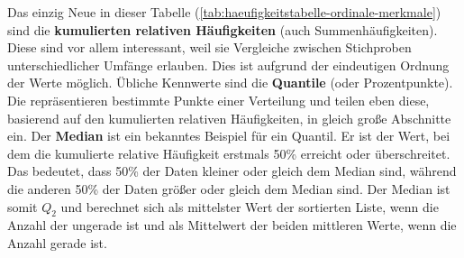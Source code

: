 \newline
Das einzig Neue in dieser Tabelle (\ref{tab:haeufigkeitstabelle-ordinale-merkmale}) sind die \textbf{kumulierten relativen Häufigkeiten} (auch Summenhäufigkeiten).
Diese sind vor allem interessant, weil sie Vergleiche zwischen Stichproben unterschiedlicher Umfänge erlauben.
Dies ist aufgrund der eindeutigen Ordnung der Werte möglich.
\newline
Übliche Kennwerte sind die \textbf{Quantile} (oder Prozentpunkte).
Die repräsentieren bestimmte Punkte einer Verteilung und teilen eben diese, basierend auf den kumulierten relativen Häufigkeiten, in gleich große Abschnitte ein. \newline
{}
Der \textbf{Median} ist ein bekanntes Beispiel für ein Quantil.
Er ist der Wert, bei dem die kumulierte relative Häufigkeit erstmals 50\% erreicht oder überschreitet.
Das bedeutet, dass 50\% der Daten kleiner oder gleich dem Median sind, während die anderen 50\% der Daten größer oder gleich dem Median sind.
Der Median ist somit $Q_2$ und berechnet sich als mittelster Wert der sortierten Liste, wenn die Anzahl der ungerade ist und als Mittelwert der beiden mittleren Werte, wenn die Anzahl gerade ist.


